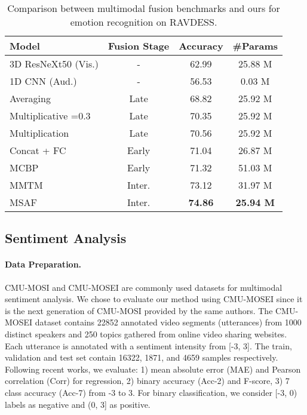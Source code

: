 \documentclass[10pt,twocolumn,letterpaper]{article}
\begin{document}
\begin{table}[t]
  \centering
  \small
    \begin{tabular}{lccc} Model & Fusion Stage & Accuracy & \#Params\\
      \hline
      3D ResNeXt50 (Vis.) & - & 62.99 & 25.88 M\\
      1D CNN (Aud.) & - & 56.53 & 0.03 M\\
      \hline
      Averaging & Late & 68.82 & 25.92 M \\
      Multiplicative =0.3 & Late & 70.35 & 25.92 M \\
      Multiplication & Late & 70.56 & 25.92 M \\
      Concat + FC & Early & 71.04 & 26.87 M\\
      MCBP & Early & 71.32 & 51.03 M\\
      MMTM & Inter. & 73.12 & 31.97 M\\
      \hline
      MSAF & Inter. & \textbf{74.86} & \textbf{25.94 M}\\
      \hline
    \end{tabular}
    \caption{Comparison between multimodal fusion benchmarks and ours for emotion recognition on RAVDESS.}
    \label{table1}
\end{table}

\subsection{Sentiment Analysis}
\paragraph{Data Preparation.}
CMU-MOSI \cite{zadeh2016mosi} and CMU-MOSEI \cite{bagher-zadeh-etal-2018-multimodal} are commonly used datasets for multimodal sentiment analysis. We chose to evaluate our method using CMU-MOSEI since it is the next generation of CMU-MOSI provided by the same authors. The CMU-MOSEI dataset contains 22852 annotated video segments (utterances) from 1000 distinct speakers and 250 topics gathered from online video sharing websites. Each utterance is annotated with a sentiment intensity from [-3, 3]. The train, validation and test set contain 16322, 1871, and 4659 samples respectively. Following recent works, we evaluate: 1) mean absolute error (MAE) and Pearson correlation (Corr) for regression, 2) binary accuracy (Acc-2) and F-score, 3) 7 class accuracy (Acc-7) from -3 to 3. For binary classification, we consider [-3, 0) labels as negative and (0, 3] as positive.
\end{document}
